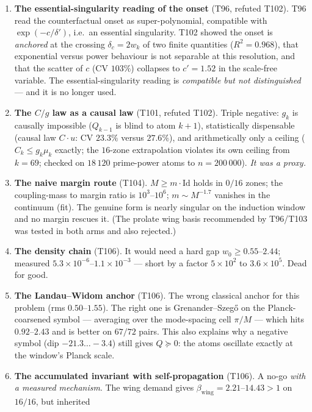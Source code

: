 \documentclass[11pt,a4paper]{article}
\begin{document}
\begin{enumerate}[leftmargin=1.6em,label=\textbf{K\arabic*.}]
\item \textbf{The essential-singularity reading of the onset} (T96, refuted T102). T96 read the
counterfactual onset as super-polynomial, compatible with $\exp(-c/\delta')$, i.e.\ an essential
singularity. T102 showed the onset is \emph{anchored} at the crossing $\delta_c=2w_k$ of two finite
quantities ($R^2=0.968$), that exponential versus power behaviour is not separable at this resolution,
and that the scatter of $c$ ($\mathrm{CV}$ $103\%$) collapses to $c'=1.52$ in the scale-free variable.
The essential-singularity reading is \emph{compatible but not distinguished} --- and it is no longer
used.
\item \textbf{The $C/g$ law as a causal law} (T101, refuted T102). Triple negative: $g_k$ is causally
impossible ($Q_{k-1}$ is blind to atom $k+1$), statistically dispensable (causal law $C\cdot u$:
$\mathrm{CV}$ $23.3\%$ versus $27.6\%$), and arithmetically only a ceiling ($C_k\le g_k\mu_k$ exactly;
the $16$-zone extrapolation violates its own ceiling from $k=69$; checked on $18\,120$ prime-power
atoms to $n=200\,000$). \emph{It was a proxy.}
\item \textbf{The naive margin route} (T104). $M\ge m\cdot\mathrm{Id}$ holds in $0/16$ zones; the
coupling-mass to margin ratio is $10^3$--$10^6$; $m\sim M^{-1.7}$ vanishes in the continuum (fit). The
genuine form is nearly singular on the induction window and no margin rescues it. (The prolate wing
basis recommended by T96/T103 was tested in both arms and also rejected.)
\item \textbf{The density chain} (T106). It would need a hard gap $w_0\ge0.55$--$2.44$; measured
$5.3\times10^{-6}$--$1.1\times10^{-3}$ --- short by a factor $5\times10^2$ to $3.6\times10^5$. Dead for
good.
\item \textbf{The Landau--Widom anchor} (T106). The wrong classical anchor for this problem
(rms $0.50$--$1.55$). The right one is Grenander--Szeg\H{o} on the Planck-coarsened symbol --- averaging
over the mode-spacing cell $\pi/M$ --- which hits $0.92$--$2.43$ and is better on $67/72$ pairs. This
also explains why a negative symbol (dip $-21.3\ldots-3.4$) still gives $Q\succeq0$: the atoms oscillate
exactly at the window's Planck scale.
\item \textbf{The accumulated invariant with self-propagation} (T106). A no-go \emph{with a measured
mechanism}. The wing demand gives $\beta_{\mathrm{wing}}=2.21$--$14.43>1$ on $16/16$, but inherited

\end{enumerate}
\end{document}
